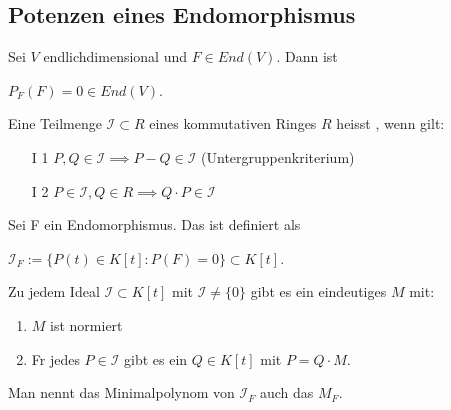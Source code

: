 \documentclass[11pt, a4paper]{article}
\begin{document}
\subsection{Potenzen eines Endomorphismus}
\begin{theorem}
 Sei $V$ endlichdimensional und $F \in End(V)$. Dann ist
\\ \centerline{$P_F(F) = 0 \in End(V)$.}
\end{theorem}
\begin{definition}
Eine Teilmenge $\mathcal{I} \subset R$ eines kommutativen Ringes $R$ heisst , wenn gilt:
\begin{enumerate}
\item[I 1] $P, Q \in \mathcal{I} \implies P - Q \in \mathcal{I}$ (Untergruppenkriterium)
\item[I 2] $P \in \mathcal{I}, Q \in R \implies Q \cdot P \in \mathcal{I}$
\end{enumerate}
\end{definition}
\begin{example}
Sei F ein Endomorphismus. Das  ist definiert als
\\ \centerline{$\mathcal{I}_F := \{ P(t) \in K[t] : P(F) = 0  \} \subset K[t]$.}
\end{example}

\begin{theorem}
Zu jedem Ideal $\mathcal{I} \subset K[t]$ mit $\mathcal{I} \neq \{0\}$ gibt es ein eindeutiges  $M$ mit:
\begin{enumerate}
\item $M$ ist normiert
\item F\uee r jedes $P \in \mathcal{I}$ gibt es ein $Q \in K[t]$ mit $P = Q \cdot M$.
\end{enumerate}
Man nennt das Minimalpolynom von $\mathcal{I}_F$ auch das $M_F$.
\end{theorem}
\end{document}
